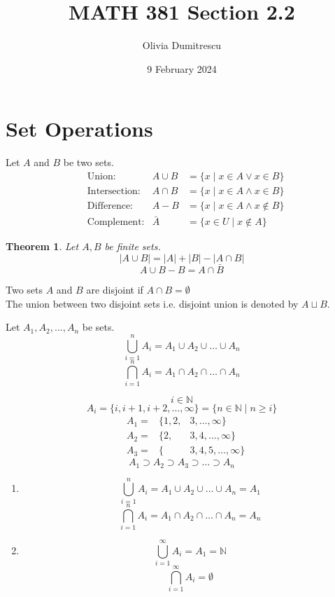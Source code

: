 \documentclass[letterpaper, 12pt]{article}
\title{MATH 381 Section 2.2}
\author{Olivia Dumitrescu}
\date{9 February 2024}
\newtheorem{theorem}{Theorem}[section]
\newenvironment{definition}[1][Definition]{\begin{trivlist}
\item[\hskip \labelsep {\bfseries #1}]}{\end{trivlist}}
\newenvironment{example}[1][Example]{\begin{trivlist}
\item[\hskip \labelsep {\bfseries #1}]}{\end{trivlist}}
\newenvironment{remark}[1][Remark]{\begin{trivlist}
\item[\hskip \labelsep {\bfseries #1}]}{\end{trivlist}}
\begin{document}
    \maketitle
    \section*{Set Operations}
    \begin{definition}
        Let $A$ and $B$ be two sets.
        \begin{align*}
            &\text{Union:} & A \cup B &= \{x \mid x \in A \vee x \in B\} \\
            &\text{Intersection:} & A \cap B &= \{x \mid x \in A \wedge x \in B\} \\
            &\text{Difference:} & A - B &= \{x \mid x \in A \wedge x \notin B\} \\
            &\text{Complement:} & \bar{A} &= \{x \in U \mid x \notin A\}
        \end{align*}
    \end{definition}
    \begin{theorem}
        Let $A, B$ be finite sets.
        \[|A \cup B| = |A| + |B| - |A \cap B|\]
        \[A \cup B - B = A \cap \bar{B}\]
    \end{theorem}
    \begin{definition}
        Two sets $A$ and $B$ are disjoint if $A \cap B = \emptyset$ \\
        The union between two disjoint sets i.e. disjoint union is denoted by $A \sqcup B$.
    \end{definition}
    \begin{remark}
        Let $A_1, A_2, \dots, A_n$ be sets.
        \[\bigcup_{i=1}^{n} A_i = A_1 \cup A_2 \cup \dots \cup A_n\]
        \[\bigcap_{i=1}^{n} A_i = A_1 \cap A_2 \cap \dots \cap A_n\]
    \end{remark}
    \begin{example}
        \[i \in \mathbb{N}\]
        \[A_i = \{i, i+1, i+2, \dots, \infty\} = \{n \in \mathbb{N} \mid n \ge i\}\]
        \begin{align*}
            &A_1 = & \{1, 2, &3, \dots, \infty\} \\
            &A_2 = & \{2, &3, 4, \dots, \infty\} \\
            &A_3 = & \{&3, 4, 5, \dots, \infty\}
        \end{align*}
        \[A_1 \supset A_2 \supset A_3 \supset \dots \supset A_n\]
        \begin{enumerate}
            \item
            \[\bigcup_{i=1}^{n} A_i = A_1 \cup A_2 \cup \dots \cup A_n = A_1\]
            \[\bigcap_{i=1}^{n} A_i = A_1 \cap A_2 \cap \dots \cap A_n = A_n\]
            \item
            \[\bigcup_{i=1}^{\infty} A_i = A_1 = \mathbb{N}\]
            \[\bigcap_{i=1}^{\infty} A_i = \emptyset\]
        \end{enumerate}
    \end{example}
\end{document}
